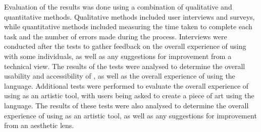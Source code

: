 Evaluation of the results was done using a combination of qualitative and quantitative methods.
Qualitative methods included user interviews and surveys, while quantitative methods included measuring the time taken to complete each task and the number of errors made during the process.
Interviews were conducted after the tests to gather feedback on the overall experience of using \sculpt with some individuals, as well as any suggestions for improvement from a technical view.
The results of the tests were analysed to determine the overall usability and accessibility of \sculpt, as well as the overall experience of using the language.
Additional tests were performed to evaluate the overall experience of using \sculpt as an artistic tool, with users being asked to create a piece of art using the language.
The results of these tests were also analysed to determine the overall experience of using \sculpt as an artistic tool, as well as any suggestions for improvement from an aesthetic lens.
\endinput